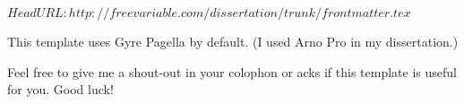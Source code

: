 {$HeadURL: http://freevariable.com/dissertation/trunk/frontmatter.tex $}
\vcinfo{}

This template uses Gyre Pagella by default. (I used Arno Pro in my dissertation.)

Feel free to give me a shout-out in your colophon or acks if this template is useful for you.
Good luck!
